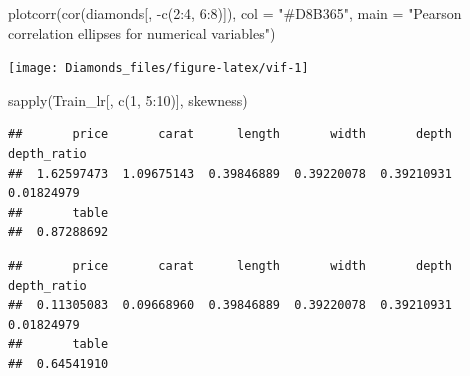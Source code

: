 \documentclass[
]{article}
\newenvironment{Shaded}{\begin{snugshade}}{\end{snugshade}}
\newcommand{\AttributeTok}[1]{\textcolor[rgb]{0.77,0.63,0.00}{#1}}
\newcommand{\DecValTok}[1]{\textcolor[rgb]{0.00,0.00,0.81}{#1}}
\newcommand{\FunctionTok}[1]{\textcolor[rgb]{0.00,0.00,0.00}{#1}}
\newcommand{\NormalTok}[1]{#1}
\newcommand{\OtherTok}[1]{\textcolor[rgb]{0.56,0.35,0.01}{#1}}
\newcommand{\SpecialCharTok}[1]{\textcolor[rgb]{0.00,0.00,0.00}{#1}}
\newcommand{\StringTok}[1]{\textcolor[rgb]{0.31,0.60,0.02}{#1}}
\begin{document}
\begin{Shaded}
\begin{Highlighting}[]
\FunctionTok{plotcorr}\NormalTok{(}\FunctionTok{cor}\NormalTok{(diamonds[, }\SpecialCharTok{{-}}\FunctionTok{c}\NormalTok{(}\DecValTok{2}\SpecialCharTok{:}\DecValTok{4}\NormalTok{, }\DecValTok{6}\SpecialCharTok{:}\DecValTok{8}\NormalTok{)]), }\AttributeTok{col =} \StringTok{"\#D8B365"}\NormalTok{,}
         \AttributeTok{main =} \StringTok{"Pearson correlation ellipses for numerical variables"}\NormalTok{)}
\end{Highlighting}
\end{Shaded}

\begin{center}\texttt{[image: Diamonds\_files/figure-latex/vif-1]} \end{center}

\begin{Shaded}
\begin{Highlighting}[]
\FunctionTok{sapply}\NormalTok{(Train\_lr[, }\FunctionTok{c}\NormalTok{(}\DecValTok{1}\NormalTok{, }\DecValTok{5}\SpecialCharTok{:}\DecValTok{10}\NormalTok{)], skewness)}
\end{Highlighting}
\end{Shaded}

\begin{verbatim}
##       price       carat      length       width       depth depth_ratio
##  1.62597473  1.09675143  0.39846889  0.39220078  0.39210931  0.01824979
##       table
##  0.87288692
\end{verbatim}

\begin{Shaded}
\end{Shaded}

\begin{verbatim}
##       price       carat      length       width       depth depth_ratio
##  0.11305083  0.09668960  0.39846889  0.39220078  0.39210931  0.01824979
##       table
##  0.64541910
\end{verbatim}
\end{document}
